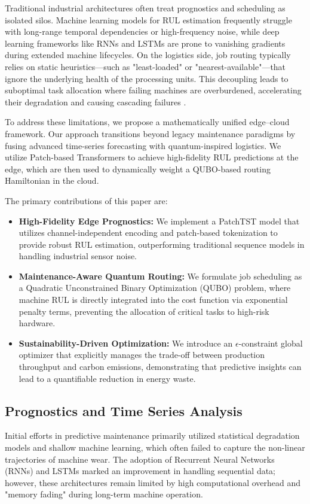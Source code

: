 \documentclass[conference]{IEEEtran}
\begin{document}
Traditional industrial architectures often treat prognostics and scheduling as isolated silos. Machine learning models for RUL estimation frequently struggle with long-range temporal dependencies or high-frequency noise, while deep learning frameworks like RNNs and LSTMs \cite{ref8} are prone to vanishing gradients during extended machine lifecycles. On the logistics side, job routing typically relies on static heuristics—such as "least-loaded" or "nearest-available"—that ignore the underlying health of the processing units. This decoupling leads to suboptimal task allocation where failing machines are overburdened, accelerating their degradation and causing cascading failures \cite{ref1_new}.

To address these limitations, we propose a mathematically unified edge–cloud framework. Our approach transitions beyond legacy maintenance paradigms by fusing advanced time-series forecasting with quantum-inspired logistics. We utilize Patch-based Transformers to achieve high-fidelity RUL predictions at the edge, which are then used to dynamically weight a QUBO-based routing Hamiltonian in the cloud.

The primary contributions of this paper are:
\begin{itemize}
  \item \textbf{High-Fidelity Edge Prognostics:} We implement a PatchTST model that utilizes channel-independent encoding and patch-based tokenization to provide robust RUL estimation, outperforming traditional sequence models in handling industrial sensor noise.
  \item \textbf{Maintenance-Aware Quantum Routing:} We formulate job scheduling as a Quadratic Unconstrained Binary Optimization (QUBO) problem, where machine RUL is directly integrated into the cost function via exponential penalty terms, preventing the allocation of critical tasks to high-risk hardware.
  \item \textbf{Sustainability-Driven Optimization:} We introduce an $\epsilon$-constraint global optimizer that explicitly manages the trade-off between production throughput and carbon emissions, demonstrating that predictive insights can lead to a quantifiable reduction in energy waste.
\end{itemize}

\subsection{Prognostics and Time Series Analysis}
Initial efforts in predictive maintenance primarily utilized statistical degradation models and shallow machine learning, which often failed to capture the non-linear trajectories of machine wear. The adoption of Recurrent Neural Networks (RNNs) and LSTMs \cite{ref8} marked an improvement in handling sequential data; however, these architectures remain limited by high computational overhead and "memory fading" during long-term machine operation.
\end{document}
